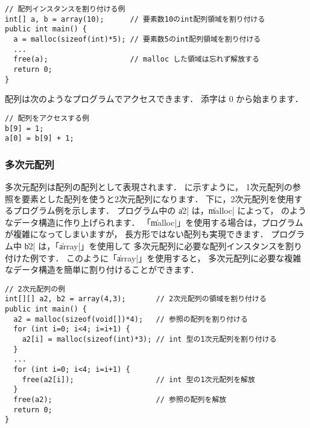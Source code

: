 \begin{mylist}
\begin{verbatim}
// 配列インスタンスを割り付ける例
int[] a, b = array(10);      // 要素数10のint配列領域を割り付ける
public int main() {
  a = malloc(sizeof(int)*5); // 要素数5のint配列領域を割り付ける
  ...
  free(a);                   // malloc した領域は忘れず解放する
  return 0;
}
\end{verbatim}
\end{mylist}

配列は次のようなプログラムでアクセスできます．
添字は 0 から始まります．

\begin{mylist}
\begin{verbatim}
// 配列をアクセスする例
b[9] = 1;
a[0] = b[9] + 1;
\end{verbatim}
\end{mylist}

\subsubsection{多次元配列}

多次元配列は配列の配列として表現されます．
に示すように，
1次元配列の参照を要素とした配列を使うと2次元配列になります．
下に，2次元配列を使用するプログラム例を示します．
プログラム中の \|a2| は，\|malloc| によって，
のようなデータ構造に作り上げられます．
「\|malloc|」を使用する場合は，プログラムが複雑になってしまいますが，
長方形ではない配列も実現できます．
プログラム中 \|b2| は，「\|array|」を使用して
多次元配列に必要な配列インスタンスを割り付けた例です．
このように「\|array|」を使用すると，
多次元配列に必要な複雑なデータ構造を簡単に割り付けることができます．



\begin{mylist}
\begin{verbatim}
// 2次元配列の例
int[][] a2, b2 = array(4,3);       // 2次元配列の領域を割り付ける
public int main() {
  a2 = malloc(sizeof(void[])*4);   // 参照の配列を割り付ける
  for (int i=0; i<4; i=i+1) {
    a2[i] = malloc(sizeof(int)*3); // int 型の1次元配列を割り付ける
  }
  ...
  for (int i=0; i<4; i=i+1) {
    free(a2[i]);                   // int 型の1次元配列を解放
  }
  free(a2);                        // 参照の配列を解放
  return 0;
}
\end{verbatim}
\end{mylist}

